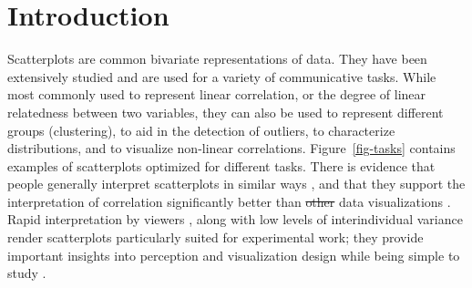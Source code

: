 \documentclass[manuscript, review, anonymous, screen]{acmart}
\providecommand{\DIFaddtex}[1]{{\protect\color{blue}\uwave{#1}}} %
\providecommand{\DIFdeltex}[1]{{\protect\color{red}\sout{#1}}}                      %
\providecommand{\DIFaddbegin}{} %
\providecommand{\DIFaddend}{} %
\providecommand{\DIFdelbegin}{} %
\providecommand{\DIFdelend}{} %
\providecommand{\DIFadd}[1]{\texorpdfstring{\DIFaddtex{#1}}{#1}} %
\providecommand{\DIFdel}[1]{\texorpdfstring{\DIFdeltex{#1}}{}} %
\newcommand{\DIFscaledelfig}{0.5}
\newlength{\DIFdelgraphicswidth} %
\newlength{\DIFdelgraphicsheight} %
\newcommand{\DIFaddincludegraphics}[2][]{{\color{blue}\fbox{\DIFOincludegraphics[#1]{#2}}}} %
\newcommand{\DIFdelincludegraphics}[2][]{%
\sbox{\DIFdelgraphicsbox}{\DIFOincludegraphics[#1]{#2}}%
\settoboxwidth{\DIFdelgraphicswidth}{\DIFdelgraphicsbox} %
\settoboxtotalheight{\DIFdelgraphicsheight}{\DIFdelgraphicsbox} %
\scalebox{\DIFscaledelfig}{%
\parbox[b]{\DIFdelgraphicswidth}{\usebox{\DIFdelgraphicsbox}\\[-\baselineskip] \rule{\DIFdelgraphicswidth}{0em}}\llap{\resizebox{\DIFdelgraphicswidth}{\DIFdelgraphicsheight}{%
\setlength{\unitlength}{\DIFdelgraphicswidth}%
\begin{picture}(1,1)%
\thicklines\linethickness{2pt} %
{\color[rgb]{1,0,0}\put(0,0){\framebox(1,1){}}}%
{\color[rgb]{1,0,0}\put(0,0){\line( 1,1){1}}}%
{\color[rgb]{1,0,0}\put(0,1){\line(1,-1){1}}}%
\end{picture}%
}\hspace*{3pt}}} %
} %
\DeclareRobustCommand{\DIFaddbegin}{\DIFOaddbegin \let\includegraphics\DIFaddincludegraphics} %
\DeclareRobustCommand{\DIFaddend}{\DIFOaddend \let\includegraphics\DIFOincludegraphics} %
\DeclareRobustCommand{\DIFdelbegin}{\DIFOdelbegin \let\includegraphics\DIFdelincludegraphics} %
\DeclareRobustCommand{\DIFdelend}{\DIFOaddend \let\includegraphics\DIFOincludegraphics} %
\begin{document}



\maketitle

\setlength{\parskip}{-0.1pt}

\hypertarget{introduction}{%
\section{Introduction}\label{introduction}}

Scatterplots are common bivariate representations of data. They have
been extensively studied and are used for a variety of communicative
tasks. While most commonly used to represent linear correlation, or the
degree of linear relatedness between two variables, they can also be
used to represent different groups (clustering), to aid in the detection
of outliers, to characterize distributions, and to visualize non-linear
correlations. Figure~\ref{fig-tasks} contains examples of scatterplots
optimized for different tasks. There is evidence that people generally
interpret scatterplots in similar ways \citep{kay_2015}, and that they
support the interpretation of correlation significantly better than
\DIFdelbegin \DIFdel{other }\DIFdelend \DIFaddbegin \DIFadd{competing }\DIFaddend data visualizations \citep{li_2010}. Rapid interpretation by
viewers \citep{rensink_2014}, along with low levels of interindividual
variance render scatterplots particularly suited for experimental work;
they provide important insights into perception and visualization design
while being simple to study \citep{rensink_2014}.
\end{document}
